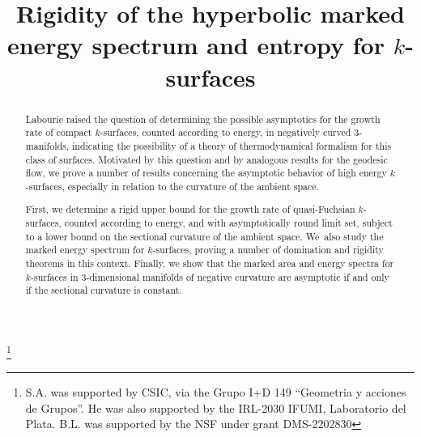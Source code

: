 \documentclass[JEP,XML,SOM,Unicode,NoEqCountersInSection,published]{cedram}
\theoremstyle{plain}
\theoremstyle{definition}
\begin{document}
\frontmatter
\title{Rigidity of the hyperbolic marked energy spectrum and entropy for \texorpdfstring{$k$}{k}-surfaces}

\author[\initial{S.} \lastname{Alvarez}]{ }
\address{CMAT, Facultad de Ciencias, Universidad de la República, \& IRL-IFUMI (CNRS),\\
Igua 4225 esq. Mataojo. Montevideo, Uruguay}
\urladdr{}

\author[\initial{B.} \lastname{Lowe}]{ }
\address{Department of Mathematics, University of Chicago,\\
Chicago IL 60637, USA}

\author[\initial{G.} \middlename{A.} \lastname{Smith}]{  }
\address{Departamento de Matemática, Pontifícia Universidade Católica do Rio de Janeiro,\\
Rua Marquês de S\~ao Vicente 225, Gávea, Rio de Janeiro 225453-900, Brazil}

\thanks{S.A. was supported by CSIC, via the Grupo I+D 149 ``Geometria y acciones de Grupos''. He was also supported by the IRL-2030 IFUMI, Laboratorio del Plata. B.L. was supported by the NSF under grant DMS-2202830}

\begin{abstract}
Labourie raised the question of determining the possible asymptotics for the growth rate of compact $k$-surfaces, counted according to energy, in negatively curved $3$\nobreakdash-manifolds, indicating the possibility of a theory of thermodynamical formalism for this class of surfaces. Motivated by this question and by analogous results for the geodesic flow, we prove a number of results concerning the asymptotic behavior of high energy $k$-surfaces, especially in relation to the curvature of the ambient space.

First, we determine a rigid upper bound for the growth rate of quasi-Fuchsian $k$-surfaces, counted according to energy, and with asymptotically round limit set, subject to a lower bound on the sectional curvature of the ambient space. We~also study the marked energy spectrum for $k$-surfaces, proving a number of domination and rigidity theorems in this context. Finally, we show that the marked area and energy spectra for $k$-surfaces in $3$\nobreakdash-dimensional manifolds of negative curvature are asymptotic if and only if the sectional curvature is constant.
\end{abstract}
\end{document}
